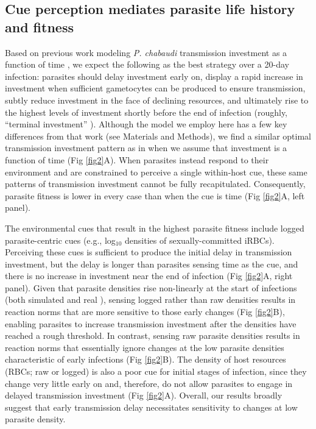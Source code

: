 \documentclass[10pt,letterpaper]{article}
\begin{document}
\subsection*{Cue perception mediates parasite life history and fitness}
Based on previous work modeling \emph{P. chabaudi} transmission investment as a function of time \cite{greischar_predicting_2016}, we expect the following as the best strategy over a 20-day infection: parasites should delay investment early on, display a rapid increase in investment when sufficient gametocytes can be produced to ensure transmission, subtly reduce investment in the face of declining resources, and ultimately rise to the highest levels of investment shortly before the end of infection (roughly, ``terminal investment'' \cite{carter_stress_2013,greischar_predicting_2016}). Although the model we employ here has a few key differences from that work (see Materials and Methods), we find a similar optimal transmission investment pattern as in \cite{greischar_predicting_2016} when we assume that investment is a function of time (Fig \ref{fig2}A). When parasites instead respond to their environment and are constrained to perceive a single within-host cue, these same patterns of transmission investment cannot be fully recapitulated. Consequently, parasite fitness is lower in every case than when the cue is time (Fig \ref{fig2}A, left panel). \newline

The environmental cues that result in the highest parasite fitness include logged parasite-centric cues (e.g., log$_{10}$ densities of sexually-committed iRBCs). Perceiving these cues is sufficient to produce the initial delay in transmission investment, but the delay is longer than parasites sensing time as the cue, and there is no increase in investment near the end of infection (Fig \ref{fig2}A, right panel). Given that parasite densities rise non-linearly at the start of infections (both simulated and real \cite{pollitt_competition_2011,huijben_data_2011, huijben_data_2013, huijben_data_2014, huijben_data_2018}), sensing logged rather than raw densities results in reaction norms that are more sensitive to those early changes (Fig \ref{fig2}B), enabling parasites to increase transmission investment after the densities have reached a rough threshold. In contrast, sensing raw parasite densities results in reaction norms that essentially ignore changes at the low parasite densities characteristic of early infections (Fig \ref{fig2}B). The density of host resources (RBCs; raw or logged) is also a poor cue for initial stages of infection, since they change very little early on and, therefore, do not allow parasites to engage in delayed transmission investment (Fig \ref{fig2}A). Overall, our results broadly suggest that early transmission delay necessitates sensitivity to changes at low parasite density.
\end{document}
